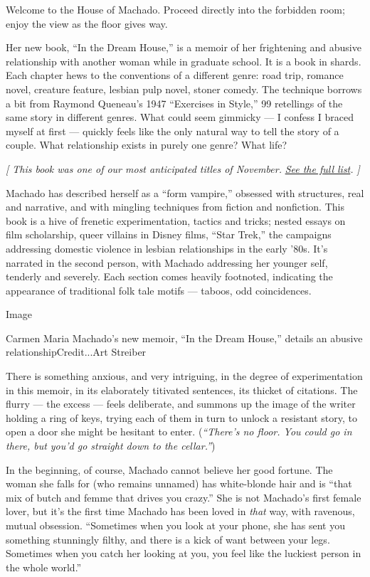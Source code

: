 Welcome to the House of Machado. Proceed directly into the forbidden
room; enjoy the view as the floor gives way.

Her new book, ``In the Dream House,'' is a memoir of her frightening and
abusive relationship with another woman while in graduate school. It is
a book in shards. Each chapter hews to the conventions of a different
genre: road trip, romance novel, creature feature, lesbian pulp novel,
stoner comedy. The technique borrows a bit from Raymond Queneau's 1947
``Exercises in Style,'' 99 retellings of the same story in different
genres. What could seem gimmicky --- I confess I braced myself at first
--- quickly feels like the only natural way to tell the story of a
couple. What relationship exists in purely one genre? What life?

\emph{{[} This book was one of our most anticipated titles of November.}
\href{https://www.nytimes.com/2019/10/31/books/new-november-books.html}{\emph{See
the full list}}\emph{. {]}}

Machado has described herself as a ``form vampire,'' obsessed with
structures, real and narrative, and with mingling techniques from
fiction and nonfiction. This book is a hive of frenetic experimentation,
tactics and tricks; nested essays on film scholarship, queer villains in
Disney films, ``Star Trek,'' the campaigns addressing domestic violence
in lesbian relationships in the early '80s. It's narrated in the second
person, with Machado addressing her younger self, tenderly and severely.
Each section comes heavily footnoted, indicating the appearance of
traditional folk tale motifs --- taboos, odd coincidences.

Image

Carmen Maria Machado's new memoir, ``In the Dream House,'' details an
abusive relationshipCredit...Art Streiber

There is something anxious, and very intriguing, in the degree of
experimentation in this memoir, in its elaborately titivated sentences,
its thicket of citations. The flurry --- the excess --- feels
deliberate, and summons up the image of the writer holding a ring of
keys, trying each of them in turn to unlock a resistant story, to open a
door she might be hesitant to enter. (\emph{``There's no floor. You
could go in there, but you'd go straight down to the cellar.''})

In the beginning, of course, Machado cannot believe her good fortune.
The woman she falls for (who remains unnamed) has white-blonde hair and
is ``that mix of butch and femme that drives you crazy.'' She is not
Machado's first female lover, but it's the first time Machado has been
loved in \emph{that} way, with ravenous, mutual obsession. ``Sometimes
when you look at your phone, she has sent you something stunningly
filthy, and there is a kick of want between your legs. Sometimes when
you catch her looking at you, you feel like the luckiest person in the
whole world.''

